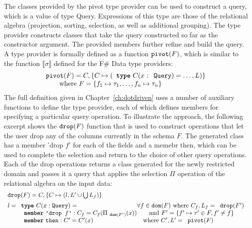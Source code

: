 \documentclass[fleqn,11pt]{report}
\newcommand{\kvd}[1]{\textnormal{\ttfamily\bfseries #1}}
\newcommand{\ident}[1]{\textnormal{\ttfamily #1}}
\newcommand{\qident}[1]{\textnormal{\ttfamily '#1'}}
\theoremstyle{definition}
\newcommand{\sem}[1]{\llbracket #1 \rrbracket}
\begin{document}
The classes provided by the pivot type provider can be used to construct a query, which is a
value of type \ident{Query}. Expressions of this type are those of the relational algebra
(projection, sorting, selection, as well as additional grouping). The type provider constructs
classes that take the query constructed so far as the constructor argument. The provided members
further refine and build the query. A type provider is formally defined as a function
$\ident{pivot}(F)$, which is similar to the function $\sem{\sigma}$ defined for the F\# Data
type providers:
%
\begin{equation*}
\begin{array}{l}
\ident{pivot}(F) = C, \{ C \mapsto (\kvd{type}~C(x:\ident{Query}) = \ldots,L) \}\\
  \qquad \textnormal{where}~F=\{ f_1 \mapsto \tau_1, \ldots, f_n \mapsto \tau_n \}
\end{array}
\end{equation*}
%
The full definition given in Chapter~\ref{ch:dotdriven} uses a number of auxiliary functions to
define the type provider, each of which defines members for specifying a particular query operation.
To illustrate the approach, the following excerpt shows the $\ident{drop}(F)$ function that is used
to construct operations that let the user drop any of the columns currently in the schema $F$.
The generated class has a member \qident{drop $f$} for each of the fields and a memebr
\ident{then}, which can be used to complete the selection and return to the choice of other query
operations. Each of the \ident{drop} operations returns a class generated for the newly restricted
domain and passes it a query that applies the selection $\Pi$ operation of the relational algebra
on the input data:
%
\begin{equation*}
\begin{array}{ll}
\ident{drop}(F) = C, \{ C \mapsto (l, L' \cup \bigcup L_f) \}\qquad\\[0.5em]
l = \kvd{type}~C(x:\ident{Query}) = &\hspace{-1em}\forall f \in \ident{dom}(F)~\textnormal{where}~C_f, L_f = \ident{drop}(F')\\
~~\qquad \kvd{member}~\qident{drop $f$} : C_f = C_f(\Pi_{\ident{dom}(F')}(x)) & \quad\textnormal{and}~ F' = \{ f'\mapsto\tau'\in F, f' \neq f\}\\
~~\qquad \kvd{member}~\ident{then} : C' = C'(x)\qquad                 &\textnormal{where}~C', L' = \ident{pivot}(F)\\
\end{array}
\end{equation*}
\end{document}

